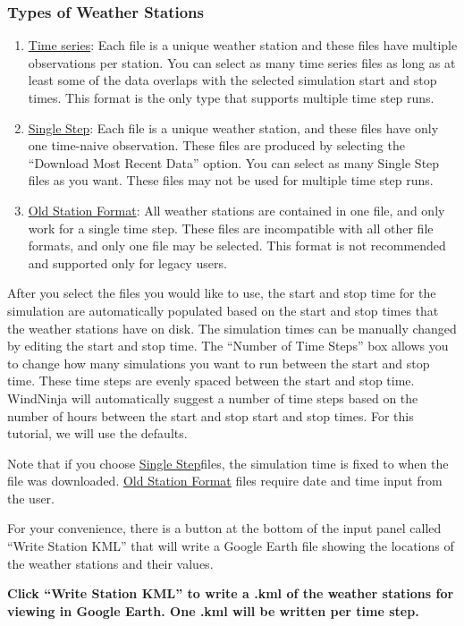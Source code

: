 \documentclass[12pt]{article}
\begin{document}
\subsubsection{Types of Weather Stations}
\begin{enumerate}
	\item  \underline{Time series}: Each file is a unique weather station and these files have multiple observations per station. You can select as many time series files as long as at least some of the data overlaps with the selected simulation start and stop times. This format is the only type that supports multiple time step runs.
	\item \underline{Single Step}: Each file is a unique weather station, and these files have only one time-naive observation. These files are produced by selecting the “Download Most Recent Data” option. You can select as many Single Step  files as you want. These files may not be used for multiple time step runs.
	\item \underline{Old Station Format}: All weather stations are contained in one file, and only work for a single time step. These files are incompatible with all other file formats, and only one file may be selected. This format is not recommended and supported only for legacy users.  
\end{enumerate}

After you select the files you would like to use, the start and stop time for the simulation are automatically populated based on the start and stop times that the weather stations have on disk. The simulation times can be manually changed by editing the start and stop time. The “Number of Time Steps” box allows you to change how many simulations you want to run between the start and stop time. These time steps are evenly spaced between the start and stop time.  WindNinja will automatically suggest a number of time steps based on the number of hours between the start and stop start and stop times.  For this tutorial, we will use the defaults.

Note that if you choose \underline{Single Step}files, the simulation time is fixed to when the file was downloaded. \underline{Old Station Format} files require date and time input from the user.

For your convenience, there is a button at the bottom of the input panel called “Write Station KML” that will write a Google Earth file showing the locations of the weather stations and their values.

\textbf{\color{red} Click “Write Station KML” to write a .kml of the weather stations for viewing in Google Earth. One .kml will be written per time step.}
\end{document}
